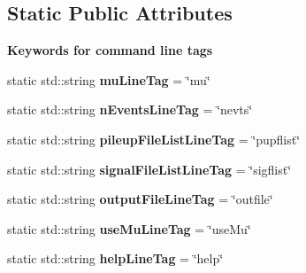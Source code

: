 \subsection*{Static Public Attributes}
\begin{Indent}{\bf Keywords for command line tags}\par
\begin{CompactItemize}
\item 
\hypertarget{classConfiguration_1_1ConfigData_ff0bc02c74ec7b2eea06e41181d214d4}{
static std::string \textbf{mu\-Line\-Tag} = \char`\"{}mu\char`\"{}}
\label{classConfiguration_1_1ConfigData_ff0bc02c74ec7b2eea06e41181d214d4}

\item 
\hypertarget{classConfiguration_1_1ConfigData_f68fcd1e57c8013a44b8033580bdce96}{
static std::string \textbf{n\-Events\-Line\-Tag} = \char`\"{}nevts\char`\"{}}
\label{classConfiguration_1_1ConfigData_f68fcd1e57c8013a44b8033580bdce96}

\item 
\hypertarget{classConfiguration_1_1ConfigData_c848cb9d20038c1880650b58b82ef028}{
static std::string \textbf{pileup\-File\-List\-Line\-Tag} = \char`\"{}pupflist\char`\"{}}
\label{classConfiguration_1_1ConfigData_c848cb9d20038c1880650b58b82ef028}

\item 
\hypertarget{classConfiguration_1_1ConfigData_540c3d56b94426ec46c20eaa6230f669}{
static std::string \textbf{signal\-File\-List\-Line\-Tag} = \char`\"{}sigflist\char`\"{}}
\label{classConfiguration_1_1ConfigData_540c3d56b94426ec46c20eaa6230f669}

\item 
\hypertarget{classConfiguration_1_1ConfigData_fdd9daabe505ca16b029f7ab9202b5ce}{
static std::string \textbf{output\-File\-Line\-Tag} = \char`\"{}outfile\char`\"{}}
\label{classConfiguration_1_1ConfigData_fdd9daabe505ca16b029f7ab9202b5ce}

\item 
\hypertarget{classConfiguration_1_1ConfigData_0c05454387854ec1965de76002a7e19b}{
static std::string \textbf{use\-Mu\-Line\-Tag} = \char`\"{}use\-Mu\char`\"{}}
\label{classConfiguration_1_1ConfigData_0c05454387854ec1965de76002a7e19b}

\item 
\hypertarget{classConfiguration_1_1ConfigData_92e700ceda1a36688a7cdd648cb6e1d6}{
static std::string \textbf{help\-Line\-Tag} = \char`\"{}help\char`\"{}}
\label{classConfiguration_1_1ConfigData_92e700ceda1a36688a7cdd648cb6e1d6}


\end{CompactItemize}
\end{Indent}

